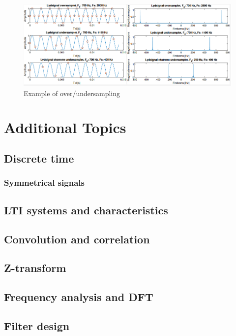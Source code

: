 \documentclass{article}
\begin{document}
\begin{figure}[h!]
    \centering
    \includegraphics[width=1\textwidth]{figures/Sampling and reconstruction/sampling_examples.png}
    \caption{Example of over/undersampling}
    \label{fig:sampling_example}
\end{figure}

\section{Additional Topics}
\subsection{Discrete time}
\subsubsection{Symmetrical signals}

\subsection{LTI systems and characteristics}

\subsection{Convolution and correlation}

\subsection{Z-transform}

\subsection{Frequency analysis and DFT}

\subsection{Filter design}
\end{document}
